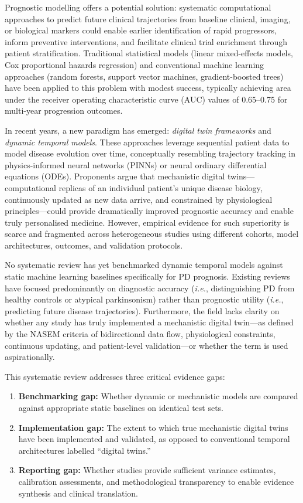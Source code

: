 \documentclass[11pt,a4paper]{article}
\newcommand{\ie}{\textit{i.e.}}
\begin{document}
Prognostic modelling offers a potential solution: systematic computational approaches to predict future clinical trajectories from baseline clinical, imaging, or biological markers could enable earlier identification of rapid progressors, inform preventive interventions, and facilitate clinical trial enrichment through patient stratification\cite{maetzler2016}. Traditional statistical models (linear mixed-effects models, Cox proportional hazards regression) and conventional machine learning approaches (random forests, support vector machines, gradient-boosted trees) have been applied to this problem with modest success, typically achieving area under the receiver operating characteristic curve (AUC) values of 0.65--0.75 for multi-year progression outcomes\cite{asgari2021}.

In recent years, a new paradigm has emerged: \emph{digital twin frameworks} and \emph{dynamic temporal models}. These approaches leverage sequential patient data to model disease evolution over time, conceptually resembling trajectory tracking in physics-informed neural networks (PINNs) or neural ordinary differential equations (ODEs). Proponents argue that mechanistic digital twins---computational replicas of an individual patient's unique disease biology, continuously updated as new data arrive, and constrained by physiological principles---could provide dramatically improved prognostic accuracy and enable truly personalised medicine\cite{bjornsson2020,laubenbacher2024}. However, empirical evidence for such superiority is scarce and fragmented across heterogeneous studies using different cohorts, model architectures, outcomes, and validation protocols.

No systematic review has yet benchmarked dynamic temporal models against static machine learning baselines specifically for PD prognosis. Existing reviews have focused predominantly on diagnostic accuracy (\ie, distinguishing PD from healthy controls or atypical parkinsonism) rather than prognostic utility (\ie, predicting future disease trajectories)\cite{asgari2021}. Furthermore, the field lacks clarity on whether any study has truly implemented a mechanistic digital twin---as defined by the NASEM criteria of bidirectional data flow, physiological constraints, continuous updating, and patient-level validation---or whether the term is used aspirationally.

This systematic review addresses three critical evidence gaps:

\begin{enumerate}[leftmargin=*]
    \item \textbf{Benchmarking gap:} Whether dynamic or mechanistic models are compared against appropriate static baselines on identical test sets.
    \item \textbf{Implementation gap:} The extent to which true mechanistic digital twins have been implemented and validated, as opposed to conventional temporal architectures labelled ``digital twins.''
    \item \textbf{Reporting gap:} Whether studies provide sufficient variance estimates, calibration assessments, and methodological transparency to enable evidence synthesis and clinical translation.
\end{enumerate}
\end{document}
